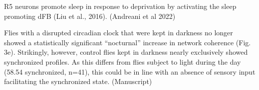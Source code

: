 \documentclass[12pt]{article}
\begin{document}
R5 neurons promote sleep in response to deprivation by activating the sleep promoting
dFB (Liu et al., 2016).
\parencite{andreaniCircadianProgrammingEllipsoid2022} (Andreani et al 2022)

\color{black}

Flies with a disrupted circadian clock that were kept in
darkness no longer showed a statistically significant “nocturnal” increase in network
coherence (Fig. 3e). Strikingly, however, control flies kept in darkness nearly exclusively showed synchronized
profiles. As this differs from flies subject to light during the day (58.54%
synchronized, n=41), this could be in line with an absence of sensory input facilitating the
synchronized state.\parencite{raccugliaCoherentMultilevelNetwork2022} (Manuscript)
\end{document}
